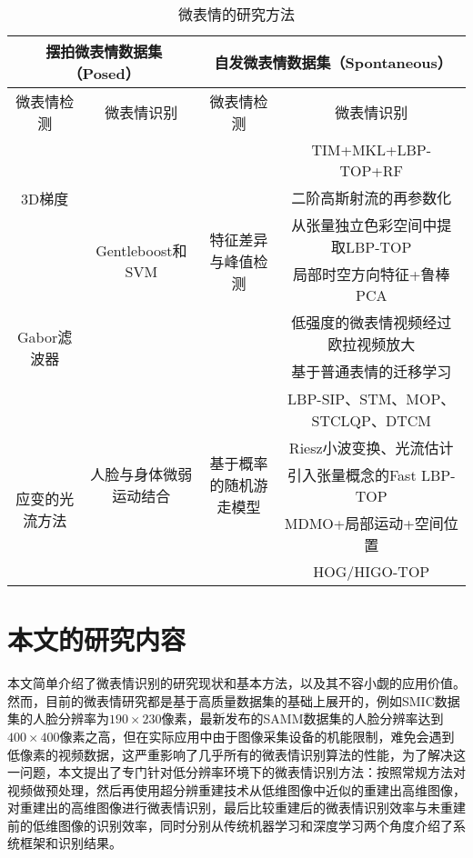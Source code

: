 \begin{table}[!htbp]
\centering
\caption{微表情的研究方法}
\label{tab2}
\footnotesize%
\setlength{\tabcolsep}{4pt}%
\renewcommand{\arraystretch}{1.2}%
\begin{tabular}{c|c|c|c}
\hline
\multicolumn{2}{c|}{摆拍微表情数据集（Posed）} & \multicolumn{2}{c}{自发微表情数据集（Spontaneous）} \\ \hline
微表情检测 & 微表情识别 & 微表情检测 & 微表情识别 \\ \hline
\multirow{3}{*}{3D梯度} & \multirow{6}{*}{Gentleboost和SVM} & \multirow{6}{*}{特征差异与峰值检测} & TIM+MKL+LBP-TOP+RF \\
 &  &  & 二阶高斯射流的再参数化 \\
 &  &  & 从张量独立色彩空间中提取LBP-TOP \\
\multirow{4}{*}{Gabor滤波器} &  &  & 局部时空方向特征+鲁棒PCA \\
 &  &  & 低强度的微表情视频经过欧拉视频放大 \\
 &  &  & 基于普通表情的迁移学习 \\
 & \multirow{5}{*}{人脸与身体微弱运动结合} & \multirow{5}{*}{基于概率的随机游走模型} & LBP-SIP、STM、MOP、STCLQP、DTCM \\
\multirow{4}{*}{应变的光流方法} &  &  & Riesz小波变换、光流估计 \\
 &  &  & 引入张量概念的Fast LBP-TOP \\
 &  &  & MDMO+局部运动+空间位置 \\
 &  &  & HOG/HIGO-TOP \\ \hline
\end{tabular}
\end{table}

\section{本文的研究内容}

本文简单介绍了微表情识别的研究现状和基本方法，以及其不容小觑的应用价值。然而，目前的微表情研究都是基于高质量数据集的基础上展开的，例如SMIC数据集的人脸分辨率为$190\times230$像素，最新发布的SAMM数据集的人脸分辨率达到$400\times400$像素之高，但在实际应用中由于图像采集设备的机能限制，难免会遇到低像素的视频数据，这严重影响了几乎所有的微表情识别算法的性能，为了解决这一问题，本文提出了专门针对低分辨率环境下的微表情识别方法：按照常规方法对视频做预处理，然后再使用超分辨重建技术从低维图像中近似的重建出高维图像，对重建出的高维图像进行微表情识别，最后比较重建后的微表情识别效率与未重建前的低维图像的识别效率，同时分别从传统机器学习和深度学习两个角度介绍了系统框架和识别结果。

